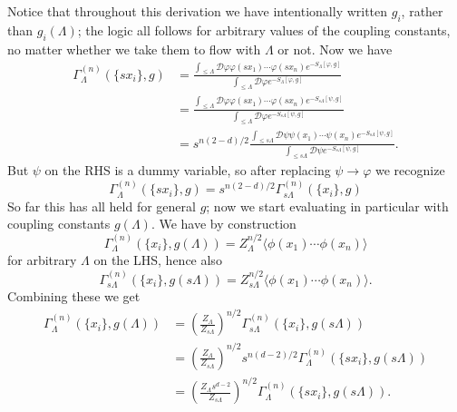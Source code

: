 \documentclass[11pt,letterpaper]{article}
\newcommand{\LP}{\left(}
\newcommand{\RP}{\right)}
\newcommand{\mc}[1]{\mathcal{#1}}
\begin{document}
Notice that throughout this derivation we have intentionally written $g_i$, rather than $g_i(\Lambda)$; the logic all follows for arbitrary values of the coupling constants, no matter whether we take them to flow with $\Lambda$ or not. Now we have \begin{equation}
\begin{aligned}
\Gamma_\Lambda^{(n)} (\{s x_i\}, g) & = \frac{\int_{\leq \Lambda} \mc{D} \varphi \varphi(sx_1) \cdots \varphi(sx_n) e^{- S_\Lambda[\varphi, g]}}{\int_{\leq \Lambda} \mc{D} \varphi e^{- S_\Lambda[\varphi, g]}} \\
& = \frac{\int_{\leq \Lambda} \mc{D} \varphi \varphi(sx_1) \cdots \varphi(sx_n) e^{- S_{s \Lambda}[\psi, g]}}{\int_{\leq \Lambda} \mc{D} \varphi e^{- S_{s \Lambda}[\psi, g]}} \\
& = s^{n(2 - d)/2} \frac{\int_{\leq s \Lambda} \mc{D} \psi \psi(x_1) \cdots \psi(x_n) e^{- S_{s \Lambda}[\psi, g]}}{\int_{\leq s \Lambda} \mc{D} \psi e^{- S_{s \Lambda}[\psi, g]}}.
\end{aligned}
\end{equation}
But $\psi$ on the RHS is a dummy variable, so after replacing $\psi \to \varphi$ we recognize \begin{equation}
\Gamma_\Lambda^{(n)} (\{s x_i\}, g) = s^{n(2 - d)/2} \Gamma_{s\Lambda}^{(n)} (\{x_i\}, g)
\end{equation}
So far this has all held for general $g$; now we start evaluating in particular with coupling constants $g(\Lambda)$. We have by construction \begin{equation}
\Gamma_\Lambda^{(n)} (\{x_i\}, g(\Lambda)) = Z_\Lambda^{n/2} \langle \phi(x_1) \cdots \phi(x_n) \rangle 
\end{equation}
for arbitrary $\Lambda$ on the LHS, hence also \begin{equation}
\Gamma_{s\Lambda}^{(n)} (\{x_i\}, g(s\Lambda)) = Z_{s\Lambda}^{n/2}\langle \phi(x_1) \cdots \phi(x_n) \rangle .
\end{equation}
Combining these we get \begin{equation}
\begin{aligned}
\Gamma_\Lambda^{(n)} (\{x_i\}, g(\Lambda)) & =\LP \frac{Z_\Lambda}{Z_{s \Lambda}} \RP^{n/2} \Gamma_{s\Lambda}^{(n)} (\{x_i\}, g(s\Lambda)) \\
& = \LP \frac{Z_\Lambda}{Z_{s \Lambda}} \RP^{n/2}  s^{n(d-2)/2} \Gamma_{\Lambda}^{(n)} (\{s x_i\}, g(s\Lambda)) \\
& = \LP \frac{Z_\Lambda s^{d-2}}{Z_{s \Lambda}} \RP^{n/2} \Gamma_{\Lambda}^{(n)} (\{s x_i\}, g(s\Lambda)).
\end{aligned}
\end{equation}








\end{document}
